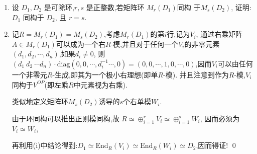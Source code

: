 \begin{enumerate}
\item[(ii)] 设 $D_1, D_2$ 是可除环,$r,s$ 是正整数,若矩阵环 $M_r(D_1)$同构
于$M_s(D_2)$, 证明: $D_1$ 同构于 $D_2$, 且 $r=s$.
\item[\textbf{证明:}]
    记$R = M_r(D_1) = M_s(D_2)$,考虑$M_r(D_1)$的第$i$行,记为$V_i$,
    通过右乘矩阵$A \in M_r(D_1)$可以成为一个右$R$-模,并且对于任何一个$V_i$的非零元素$(d_1, d_2, \cdots, d_n)$,如果$d_i \neq 0$,
   则$(d_1 \  d_2 \ \cdots d_n) \cdot \mathrm{diag}(0, 0, \cdots,d_i^{-1} \cdots ,0) = (0,0,\cdots, 1, 0, \cdots, 0)$,因而$V_i$可以由任何一个非零元$R$-生成,即其为一个极小右理想(即单$R$-模).
    并且注意到作为$R$-模,$V_i$同构于$V^{OP}$(即左乘$R$中元素视为右乘).

    类似地定义矩阵环$M_s(D_2)$诱导的$s$个右单模$W_i$.

    由于环同构可以推出正则模同构,故
    $R \simeq \oplus_{i=1}^r V_i \simeq \oplus_{i=1}^s W_i$, 因而必须为$V_i\simeq W_i$,

    再利用(i)中结论得到:$D_1 \simeq \mathrm{End}_{R}(V_i) \simeq \mathrm{End}_R(W_i) \simeq D_2$,因而得证!
    \qed


\end{enumerate}
